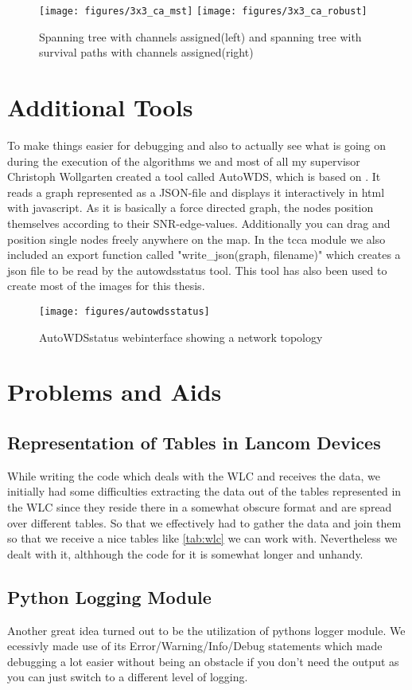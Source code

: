     \begin{figure}[t]
      \centering
      \texttt{[image: figures/3x3\_ca\_mst]}
      \texttt{[image: figures/3x3\_ca\_robust]}
      \caption{Spanning tree with channels assigned(left) and spanning tree with survival paths with channels assigned(right)}
      \label{fig:3x3third}
    \end{figure}
\section{Additional Tools}
  To make things easier for debugging and also to actually see what is going on during the execution of the algorithms we and most of all my supervisor Christoph
  Wollgarten created a tool called AutoWDS, which is based on \cite{d3js}. It reads a graph represented as a \ac{JSON}-file and displays it interactively in html with javascript.
  As it is basically a force directed graph, the nodes position themselves according to their SNR-edge-values. Additionally you can drag and position single nodes freely
  anywhere on the map.
  In the tcca module we also included an export function called "write\_json(graph, filename)" which creates a json file to be read by the autowdsstatus tool.
  This tool has also been used to create most of the images for this thesis.
  
  \begin{figure}[t]
    \centering
    \texttt{[image: figures/autowdsstatus]}
    \caption{AutoWDSstatus webinterface showing a network topology}
    \label{fig:autowdsstatus}
  \end{figure}
  
\section{Problems and Aids}
  \subsection{Representation of Tables in Lancom Devices}
    While writing the code which deals with the WLC and receives the data, we initially had some difficulties extracting the data out of the tables represented in the WLC since
    they reside there in a somewhat obscure format and are spread over different tables. So that we effectively had to gather the data and join them so that we receive a
    nice tables like \ref{tab:wlc} we can work with. Nevertheless we dealt with it, althhough the code for it is somewhat longer and unhandy.

  \subsection{Python Logging Module}
    Another great idea turned out to be the utilization of pythons logger module. We ecessivly made use of its Error/Warning/Info/Debug statements which made debugging
    a lot easier without being an obstacle if you don't need the output as you can just switch to a different level of logging.
  
